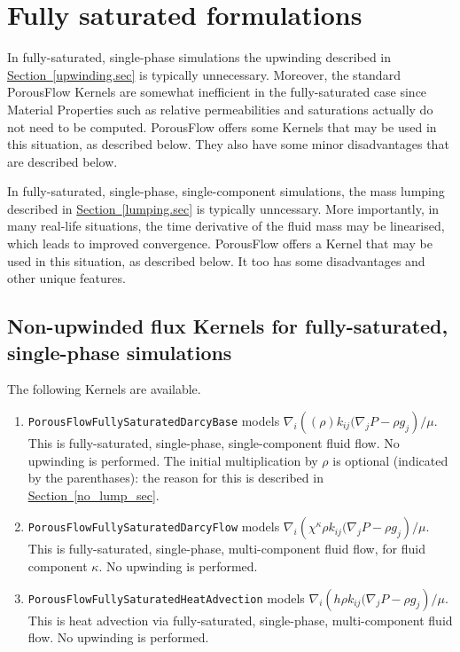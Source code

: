 \documentclass[12pt]{report}
\def\species{\kappa}
\def\massfrac{\chi}
\begin{document}
\section{Fully saturated formulations}
\label{sec.full.sat}

In fully-saturated, single-phase simulations the upwinding described
in \hyperref[upwinding.sec]{Section~\ref*{upwinding.sec}} is typically
unnecessary.  Moreover, the standard PorousFlow Kernels are somewhat
inefficient in the fully-saturated case since Material Properties such
as relative permeabilities and saturations actually do not need to be
computed.  PorousFlow offers some Kernels that may be used in this
situation, as described below.  They also have some minor
disadvantages that are described below.

In fully-saturated, single-phase, single-component simulations, the
mass lumping described in
\hyperref[lumping.sec]{Section~\ref*{lumping.sec}} is typically
unncessary.  More importantly, in many real-life situations, the time
derivative of the fluid mass may be linearised, which leads to
improved convergence.  PorousFlow offers a Kernel that may be used in
this situation, as described below.  It too has some disadvantages and
other unique features.

\subsection{Non-upwinded flux Kernels for fully-saturated,
  single-phase simulations}
\label{nonupwinded.flux.sec}

The following Kernels are available.
\begin{enumerate}
\item {\tt PorousFlowFullySaturatedDarcyBase} models $\nabla_{i}
  \left( (\rho) k_{ij} (\nabla_{j} P - \rho g_{j}\right) / \mu$.  This
  is fully-saturated, single-phase, single-component fluid flow.  No
  upwinding is performed.  The initial multiplication by $\rho$ is
  optional (indicated by the parenthases): the reason for this is
  described in \hyperref[no_lump_sec]{Section~\ref*{no_lump_sec}}.
\item {\tt PorousFlowFullySaturatedDarcyFlow} models $\nabla_{i}
  \left( \massfrac^{\species} \rho k_{ij} (\nabla_{j} P - \rho g_{j}\right) / \mu$.  This is
  fully-saturated, single-phase, multi-component fluid flow, for fluid
  component $\species$.  No
  upwinding is performed.
\item {\tt PorousFlowFullySaturatedHeatAdvection} models $\nabla_{i}
  \left( h \rho k_{ij} (\nabla_{j} P - \rho g_{j}\right) / \mu$.  This is
  heat advection via fully-saturated, single-phase, multi-component fluid flow.  No
  upwinding is performed.
\end{enumerate}
\end{document}
